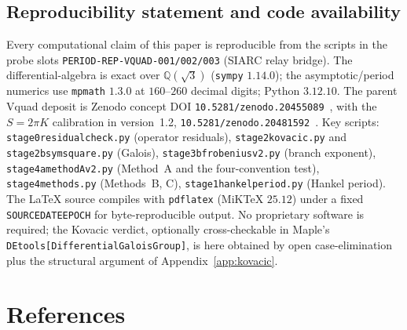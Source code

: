 \documentclass[11pt,reqno]{amsart}
\renewcommand{\_}{\vquadorigunderscore\allowbreak}
\theoremstyle{plain}
\theoremstyle{definition}
\newcommand{\Qsqrt}{\mathbb{Q}(\sqrt3)}
\begin{document}
\subsection{Reproducibility statement and code availability}\label{app:repro}
Every computational claim of this paper is reproducible from the scripts in the probe slots
\texttt{PERIOD-REP-VQUAD-001/002/003} (SIARC relay bridge). The differential-algebra is exact over
$\Qsqrt$ (\texttt{sympy} $1.14.0$); the asymptotic/period numerics use \texttt{mpmath} $1.3.0$ at
$160$--$260$ decimal digits; Python $3.12.10$. The parent V\_quad deposit is Zenodo concept DOI
\texttt{10.5281/zenodo.20455089}~\cite{Vquad}, with the $S=2\pi K$ calibration in version~1.2,
\texttt{10.5281/zenodo.20481592}~\cite{StokesNote}. Key scripts:
\texttt{stage0\_residual\_check.py} (operator residuals), \texttt{stage2\_kovacic.py} and
\texttt{stage2b\_symsquare.py} (Galois), \texttt{stage3b\_frobenius\_v2.py} (branch exponent),
\texttt{stage4a\_methodA\_v2.py} (Method~A and the four-convention test),
\texttt{stage4\_methods.py} (Methods~B, C), \texttt{stage1\_hankel\_period.py} (Hankel period).
The LaTeX source compiles with \texttt{pdflatex} (MiKTeX $25.12$) under a fixed
\texttt{SOURCE\_DATE\_EPOCH} for byte-reproducible output. No proprietary software is required;
the Kovacic verdict, optionally cross-checkable in Maple's
\texttt{DEtools[DifferentialGaloisGroup]}, is here obtained by open case-elimination plus the
structural argument of Appendix~\ref{app:kovacic}.

\section*{References}
\end{document}
